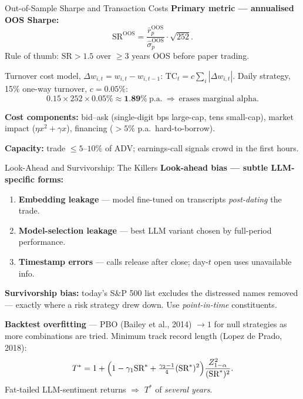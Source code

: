 \documentclass[9pt,t]{beamer}
\begin{document}
\begin{frame}{Out-of-Sample Sharpe and Transaction Costs}
\textbf{Primary metric --- annualised OOS Sharpe:}
\[
\text{SR}^{\text{OOS}}=\frac{\bar r_p^{\text{OOS}}}{\hat\sigma_p^{\text{OOS}}}\cdot\sqrt{252}.
\]
\footnotesize Rule of thumb: $\text{SR}>1.5$ over $\ge 3$ years OOS before paper trading.

\normalsize
\begin{underhood}
Turnover cost model, $\Delta w_{i,t}=w_{i,t}-w_{i,t-1}$:\quad
$\text{TC}_t=c\sum_i|\Delta w_{i,t}|$. Daily strategy, 15\% one-way turnover, $c=0.05\%$:
\[
0.15\times 252\times 0.05\%\approx \textbf{1.89\%}\ \text{p.a.} \ \Rightarrow\ \text{erases marginal alpha.}
\]
\end{underhood}

\textbf{Cost components:} bid--ask (single-digit bps large-cap, tens small-cap),
market impact ($\eta x^2+\gamma x$), financing ($>5\%$ p.a.\ hard-to-borrow).

\textbf{Capacity:} trade $\le 5$--$10\%$ of ADV; earnings-call signals crowd in the first hours.
\end{frame}

\begin{frame}{Look-Ahead and Survivorship: The Killers}
\small
\textbf{Look-ahead bias --- subtle LLM-specific forms:}
\begin{enumerate}
  \item \textbf{Embedding leakage} --- model fine-tuned on transcripts \emph{post-dating} the trade.
  \item \textbf{Model-selection leakage} --- best LLM variant chosen by full-period performance.
  \item \textbf{Timestamp errors} --- calls release after close; day-$t$ open uses unavailable info.
\end{enumerate}

\textbf{Survivorship bias:} today's S\&P 500 list excludes the distressed names removed ---
exactly where a risk strategy drew down. Use \emph{point-in-time} constituents.

\begin{underhood}
\textbf{Backtest overfitting} --- PBO (Bailey et al., 2014) $\to 1$ for null strategies as more
combinations are tried. Minimum track record length (Lopez de Prado, 2018):
\[
T^*=1+\Bigl(1-\gamma_1\text{SR}^*+\tfrac{\gamma_2-1}{4}(\text{SR}^*)^2\Bigr)\frac{Z_{1-\alpha}^2}{(\text{SR}^*)^2}.
\]
Fat-tailed LLM-sentiment returns $\Rightarrow$ $T^*$ of \emph{several years}.
\end{underhood}
\end{frame}
\end{document}
